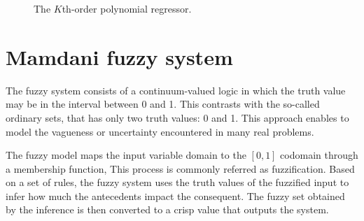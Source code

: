 \documentclass[english]{sobraep}
\begin{document}
\begin{figure}[htp]
    
    \caption{The \(K\)th-order polynomial regressor.}
    \label{fig:kth-order-poly}
\end{figure}

\section{Mamdani fuzzy system}

The fuzzy system consists of a continuum-valued logic in which the truth value may be in the interval between 0 and 1. This contrasts with the so-called ordinary sets, that has only two truth values: 0 and 1. This approach enables to model the vagueness or uncertainty encountered in many real problems.

The fuzzy model maps the input variable domain to the \(\left[ 0,1 \right]\) codomain through a membership function, This process is commonly referred as fuzzification. Based on a set of rules, the fuzzy system uses the truth values of the fuzzified input to infer how much the antecedents impact the consequent. The fuzzy set obtained by the inference is then converted to a crisp value that outputs the system.
\end{document}
